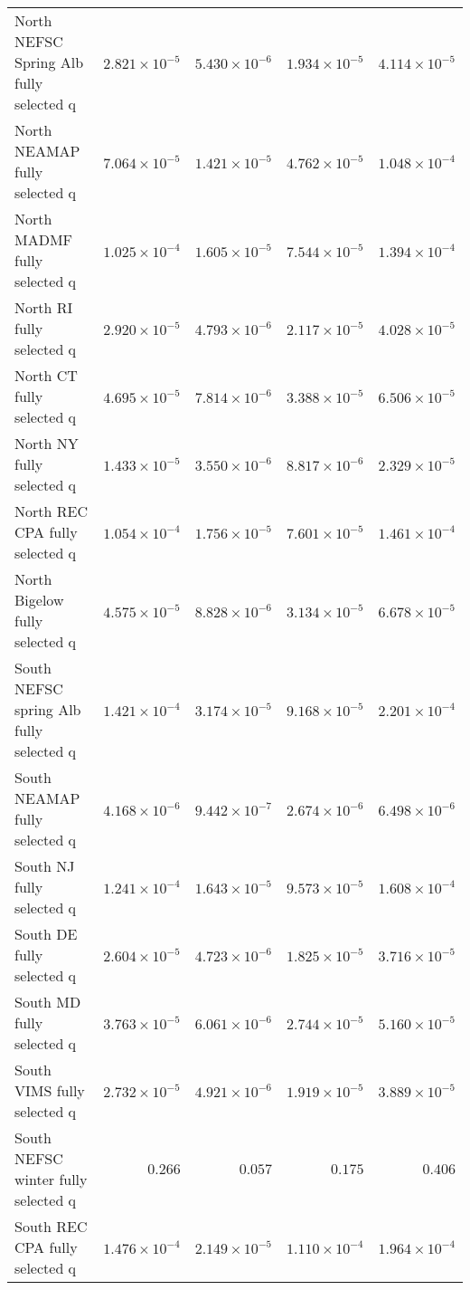 \documentclass[
]{article}
\begin{document}
\begin{landscape}
\begin{longtable}[t]{lrrrr}
\addlinespace
North NEFSC Spring Alb fully selected q & $2.821\times 10^{-5}$ & $5.430\times 10^{-6}$ & $1.934\times 10^{-5}$ & $4.114\times 10^{-5}$\\
North NEAMAP fully selected q & $7.064\times 10^{-5}$ & $1.421\times 10^{-5}$ & $4.762\times 10^{-5}$ & $1.048\times 10^{-4}$\\
North MADMF fully selected q & $1.025\times 10^{-4}$ & $1.605\times 10^{-5}$ & $7.544\times 10^{-5}$ & $1.394\times 10^{-4}$\\
North RI fully selected q & $2.920\times 10^{-5}$ & $4.793\times 10^{-6}$ & $2.117\times 10^{-5}$ & $4.028\times 10^{-5}$\\
North CT fully selected q & $4.695\times 10^{-5}$ & $7.814\times 10^{-6}$ & $3.388\times 10^{-5}$ & $6.506\times 10^{-5}$\\
\addlinespace
North NY fully selected q & $1.433\times 10^{-5}$ & $3.550\times 10^{-6}$ & $8.817\times 10^{-6}$ & $2.329\times 10^{-5}$\\
North REC CPA fully selected q & $1.054\times 10^{-4}$ & $1.756\times 10^{-5}$ & $7.601\times 10^{-5}$ & $1.461\times 10^{-4}$\\
North Bigelow fully selected q & $4.575\times 10^{-5}$ & $8.828\times 10^{-6}$ & $3.134\times 10^{-5}$ & $6.678\times 10^{-5}$\\
South NEFSC spring Alb fully selected q & $1.421\times 10^{-4}$ & $3.174\times 10^{-5}$ & $9.168\times 10^{-5}$ & $2.201\times 10^{-4}$\\
South NEAMAP fully selected q & $4.168\times 10^{-6}$ & $9.442\times 10^{-7}$ & $2.674\times 10^{-6}$ & $6.498\times 10^{-6}$\\
\addlinespace
South NJ fully selected q & $1.241\times 10^{-4}$ & $1.643\times 10^{-5}$ & $9.573\times 10^{-5}$ & $1.608\times 10^{-4}$\\
South DE fully selected q & $2.604\times 10^{-5}$ & $4.723\times 10^{-6}$ & $1.825\times 10^{-5}$ & $3.716\times 10^{-5}$\\
South MD fully selected q & $3.763\times 10^{-5}$ & $6.061\times 10^{-6}$ & $2.744\times 10^{-5}$ & $5.160\times 10^{-5}$\\
South VIMS fully selected q & $2.732\times 10^{-5}$ & $4.921\times 10^{-6}$ & $1.919\times 10^{-5}$ & $3.889\times 10^{-5}$\\
South NEFSC winter fully selected q & $0.266$ & $0.057$ & $0.175$ & $0.406$\\
\addlinespace
South REC CPA fully selected q & $1.476\times 10^{-4}$ & $2.149\times 10^{-5}$ & $1.110\times 10^{-4}$ & $1.964\times 10^{-4}$\\

\end{longtable}
\end{landscape}
\end{document}
